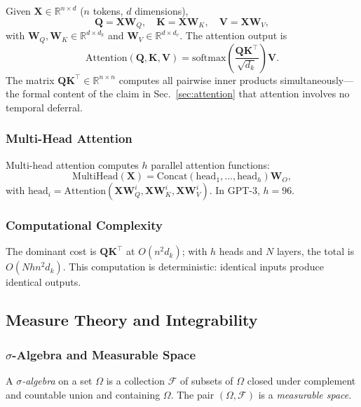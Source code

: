 \documentclass[a4paper,twocolumn,11pt]{article}
\begin{document}
Given $\mathbf{X} \in \mathbb{R}^{n \times d}$ ($n$ tokens, $d$ dimensions),
\[
\mathbf{Q} = \mathbf{X} \mathbf{W}_Q, \quad \mathbf{K} = \mathbf{X} \mathbf{W}_K, \quad \mathbf{V} = \mathbf{X} \mathbf{W}_V,
\]
with $\mathbf{W}_Q, \mathbf{W}_K \in \mathbb{R}^{d \times d_k}$ and $\mathbf{W}_V \in \mathbb{R}^{d \times d_v}$. The attention output is
\[
\mathrm{Attention}(\mathbf{Q}, \mathbf{K}, \mathbf{V}) = \mathrm{softmax}\!\left(\frac{\mathbf{Q} \mathbf{K}^\top}{\sqrt{d_k}}\right) \mathbf{V}.
\]
The matrix $\mathbf{Q}\mathbf{K}^\top \in \mathbb{R}^{n \times n}$ computes all pairwise inner products simultaneously---the formal content of the claim in Sec.~\ref{sec:attention} that attention involves no temporal deferral.

\subsubsection*{Multi-Head Attention}

Multi-head attention computes $h$ parallel attention functions:
\[
\mathrm{MultiHead}(\mathbf{X}) = \mathrm{Concat}(\mathrm{head}_1, \ldots, \mathrm{head}_h) \mathbf{W}_O,
\]
with $\mathrm{head}_i = \mathrm{Attention}(\mathbf{X} \mathbf{W}_Q^i, \mathbf{X} \mathbf{W}_K^i, \mathbf{X} \mathbf{W}_V^i)$. In GPT-3, $h = 96$.

\subsubsection*{Computational Complexity}

The dominant cost is $\mathbf{Q} \mathbf{K}^\top$ at $O(n^2 d_k)$; with $h$ heads and $N$ layers, the total is $O(N h n^2 d_k)$. This computation is deterministic: identical inputs produce identical outputs.

\subsection{Measure Theory and Integrability}
\label{sec:A5}

\subsubsection*{$\sigma$-Algebra and Measurable Space}

A \emph{$\sigma$-algebra} on a set $\Omega$ is a collection $\mathcal{F}$ of subsets of $\Omega$ closed under complement and countable union and containing $\Omega$. The pair $(\Omega, \mathcal{F})$ is a \emph{measurable space}.
\end{document}
